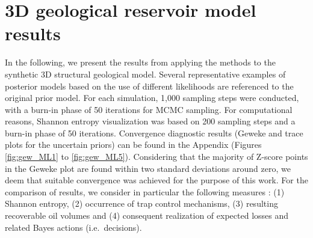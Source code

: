 		\section{3D geological reservoir model results}
		In the following, we present the results from applying the methods to the synthetic 3D structural geological model. Several representative examples of posterior models based on the use of different likelihoods are referenced to the original prior model. For each simulation, 1,000 sampling steps were conducted, with a burn-in phase of 50 iterations for MCMC sampling. For computational reasons, Shannon entropy visualization was based on 200 sampling steps and a burn-in phase of 50 iterations. Convergence diagnostic results (Geweke and trace plots for the uncertain priors) can be found in the Appendix (Figures \ref{fig:gew_ML1} to \ref{fig:gew_ML5}). Considering that the majority of Z-score points in the Geweke plot are found within two standard deviations around zero, we deem that suitable convergence was achieved for the purpose of this work. For the comparison of results, we consider in particular the following measures : (1) Shannon entropy, (2) occurrence of trap control mechanisms, (3) resulting recoverable oil volumes and (4) consequent realization of expected losses and related Bayes actions (i.e.\ decisions).
		
